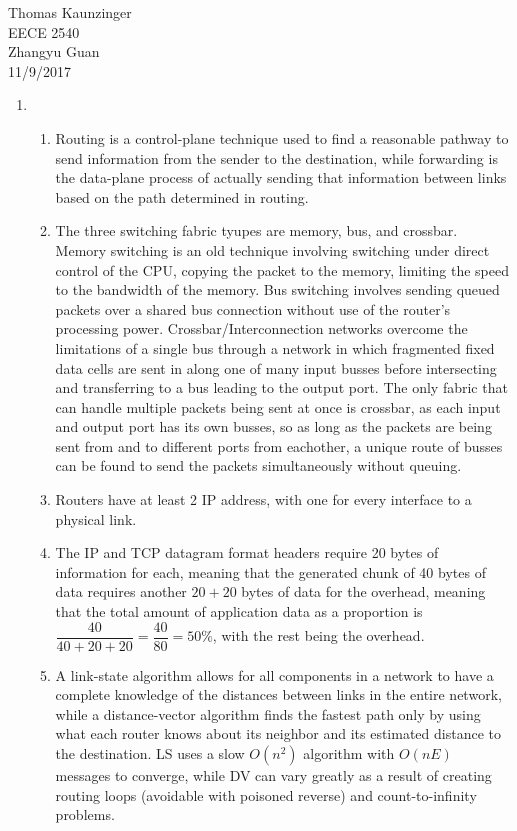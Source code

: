 \documentclass[12pt]{article}
\begin{document}
\noindent Thomas Kaunzinger\\
EECE 2540\\
Zhangyu Guan\\
11/9/2017\\
\begin{enumerate}

	\item \begin{enumerate}

			\item Routing is a control-plane technique used to find a reasonable pathway to send information from the sender to the destination, while forwarding is the data-plane process of actually sending that information between links based on the path determined in routing.
			\item The three switching fabric tyupes are memory, bus, and crossbar. Memory switching is an old technique involving switching under direct control of the CPU, copying the packet to the memory, limiting the speed to the bandwidth of the memory. Bus switching involves sending queued packets over a shared bus connection without use of the router's processing power. Crossbar/Interconnection networks overcome the limitations of a single bus through a network in which fragmented fixed data cells are sent in along one of many input busses before intersecting and transferring to a bus leading to the output port. The only fabric that can handle multiple packets being sent at once is crossbar, as each input and output port has its own busses, so as long as the packets are being sent from and to different ports from eachother, a unique route of busses can be found to send the packets simultaneously without queuing.
			\item Routers have at least 2 IP address, with one for every interface to a physical link.
			\item The IP and TCP datagram format headers require 20 bytes of information for each, meaning that the generated chunk of 40 bytes of data requires another $20 + 20$ bytes of data for the overhead, meaning that the total amount of application data as a proportion is $\dfrac{40}{40+20+20} = \dfrac{40}{80} = 50\%$, with the rest being the overhead.
			\item A link-state algorithm allows for all components in a network to have a complete knowledge of the distances between links in the entire network, while a distance-vector algorithm finds the fastest path only by using what each router knows about its neighbor and its estimated distance to the destination. LS uses a slow $O(n^2)$ algorithm with $O(nE)$ messages to converge, while DV can vary greatly as a result of creating routing loops (avoidable with poisoned reverse) and count-to-infinity problems.

\end{enumerate}
\end{enumerate}
\end{document}
